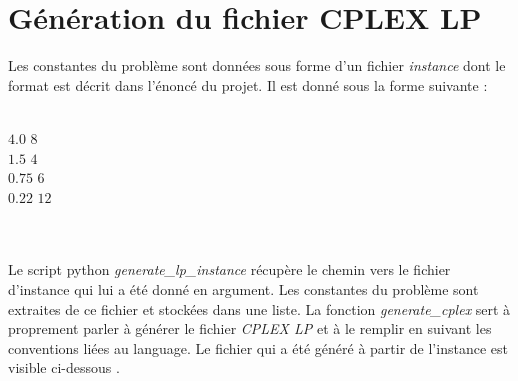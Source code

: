 \documentclass[12pt, openany]{report}
\begin{document}
\newpage
\chapter{Génération du fichier CPLEX LP}

Les constantes du problème sont données sous forme d'un fichier \textit{instance} dont le format est décrit dans l'énoncé du projet.
Il est donné sous la forme suivante : \\ \\
\begin{minipage}{1\textwidth}
\begin{center}
$4.0$ \quad $8$ \\
$1.5$ \quad $4$ \\
$0.75$ \quad $6$ \\
$0.22$ \quad $12$ \\
\end{center}
\end{minipage}
\\ \\
Le script python \textit{generate\_lp\_instance} récupère le chemin vers le fichier d'instance qui lui a été donné en argument. Les constantes du problème sont extraites de ce fichier et stockées dans une liste. 
La fonction \textit{generate\_cplex} sert à proprement parler à générer le fichier \textit{CPLEX LP} et à le remplir en suivant les conventions liées au language. Le fichier qui a été généré à partir de l'instance est visible ci-dessous .
\end{document}
